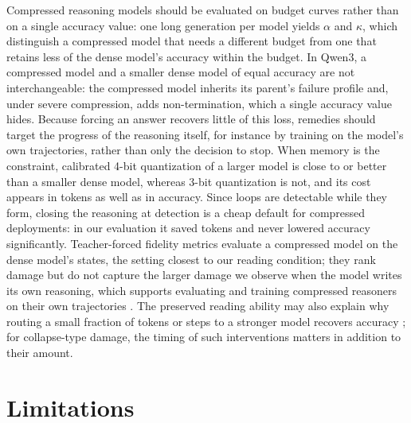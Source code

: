 \documentclass[10pt]{article}
\begin{document}
Compressed reasoning models should be evaluated on budget curves rather than on a single accuracy value: one long generation per model yields $\alpha$ and $\kappa$, which distinguish a compressed model that needs a different budget from one that retains less of the dense model's accuracy within the budget. In Qwen3, a compressed model and a smaller dense model of equal accuracy are not interchangeable: the compressed model inherits its parent's failure profile and, under severe compression, adds non-termination, which a single accuracy value hides. Because forcing an answer recovers little of this loss, remedies should target the progress of the reasoning itself, for instance by training on the model's own trajectories, rather than only the decision to stop. When memory is the constraint, calibrated 4-bit quantization of a larger model is close to or better than a smaller dense model, whereas 3-bit quantization is not, and its cost appears in tokens as well as in accuracy. Since loops are detectable while they form, closing the reasoning at detection is a cheap default for compressed deployments: in our evaluation it saved tokens and never lowered accuracy significantly. Teacher-forced fidelity metrics evaluate a compressed model on the dense model's states, the setting closest to our reading condition; they rank damage but do not capture the larger damage we observe when the model writes its own reasoning, which supports evaluating and training compressed reasoners on their own trajectories \citep{chen2026onpolicy,zheng2026rightonq}. The preserved reading ability may also explain why routing a small fraction of tokens or steps to a stronger model recovers accuracy \citep{huang2026relayllm,akhauri2025splitreason}; for collapse-type damage, the timing of such interventions matters in addition to their amount.

\section{Limitations}
\end{document}
